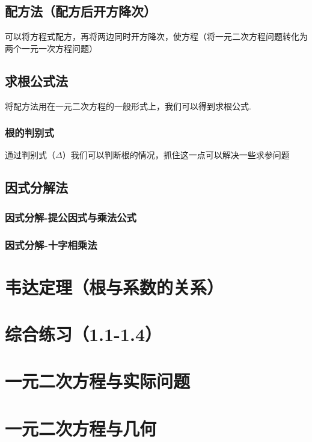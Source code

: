 \documentclass[lang=cn, 10pt, titlestyle=hang, oneside]{elegantbook}
\begin{document}
\subsection{配方法（配方后开方降次）}





可以将方程式配方，再将两边同时开方降次，使方程（将一元二次方程问题转化为两个一元一次方程问题）

\subsection{求根公式法}



将配方法用在一元二次方程的一般形式上，我们可以得到求根公式.

\subsubsection{根的判别式}

通过判别式（\(\Delta \)）我们可以判断根的情况，抓住这一点可以解决一些求参问题


\subsection{因式分解法}

\subsubsection{因式分解-提公因式与乘法公式}

\subsubsection{因式分解-十字相乘法}


\section{韦达定理（根与系数的关系）}

\section{综合练习（1.1-1.4）}

\section{一元二次方程与实际问题}

\section{一元二次方程与几何}
\end{document}
